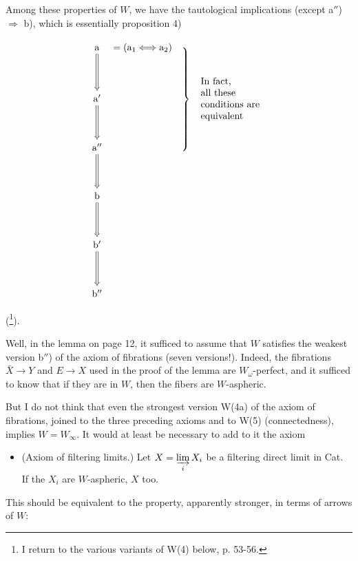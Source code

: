 Among these properties of $W$, we have the tautological implications (except a$''$) $\Longrightarrow$ b), which is essentially proposition 4)


\[
\begin{tikzcd}[row sep=huge, column sep=0pt]
\mathrm{a} \arrow[d, Rightarrow] & {}= (\mathrm{a}_1 \Longleftrightarrow \mathrm{a}_2) & \hspace{2.5cm} \\
\mathrm{a}' \arrow[d, Rightarrow] & & \smash{\left.\rule[-1.8cm]{0pt}{3.6cm}\right\}\ \text{\begin{tabular}{l}In fact,\\ all these\\ conditions are\\ equivalent\end{tabular}}} \\
\mathrm{a}'' \arrow[d, Rightarrow] & & \\
\mathrm{b} \arrow[d, Rightarrow] & & \\
\mathrm{b}' \arrow[d, Rightarrow] & & \\
\mathrm{b}'' & &
\end{tikzcd}
\]

(\footnote[33]{I return to the various variants of W(4) below, p. 53-56.}).

Well, in the lemma on page 12, it sufficed to assume that $W$ satisfies the weakest version b$''$) of the axiom of fibrations (seven versions!). Indeed, the fibrations $\bar{X} \longrightarrow Y$ and $E \longrightarrow X$ used in the proof of the lemma are $W_\omega$-perfect, and it sufficed to know that if they are in $W$, then the fibers are $W$-aspheric.

But I do not think that even the strongest version W(4a) of the axiom of fibrations, joined to the three preceding axioms and to W(5) (connectedness), implies $W = W_\infty$. It would at least be necessary to add to it the axiom

\begin{itemize}[leftmargin=4em, labelwidth=3em, labelsep=0.6em]
\item[\textbf{W(6)}] (Axiom of filtering limits.) Let $X = \varinjlim\limits_{i} X_i$ be a filtering direct limit in Cat. If the $X_i$ are $W$-aspheric, $X$ too.
\end{itemize}

This should be equivalent to the property, apparently stronger, in terms of arrows of $W$:

